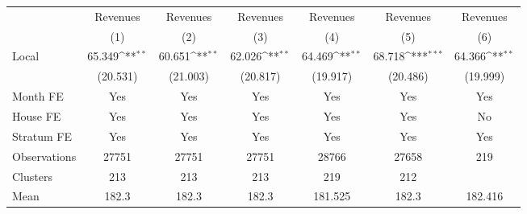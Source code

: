 {
\def\sym#1{\ifmmode^{#1}\else\(^{#1}\)\fi}
\begin{tabular}{l*{6}{c}}
\hline\hline
                &\multicolumn{1}{c}{Revenues}&\multicolumn{1}{c}{Revenues}&\multicolumn{1}{c}{Revenues}&\multicolumn{1}{c}{Revenues}&\multicolumn{1}{c}{Revenues}&\multicolumn{1}{c}{Revenues}\\
                &\multicolumn{1}{c}{(1)}         &\multicolumn{1}{c}{(2)}         &\multicolumn{1}{c}{(3)}         &\multicolumn{1}{c}{(4)}         &\multicolumn{1}{c}{(5)}         &\multicolumn{1}{c}{(6)}         \\
\hline
Local           &   65.349\sym{**} &   60.651\sym{**} &   62.026\sym{**} &   64.469\sym{**} &   68.718\sym{***}&   64.366\sym{**} \\
                & (20.531)         & (21.003)         & (20.817)         & (19.917)         & (20.486)         & (19.999)         \\
Month FE        &      Yes         &      Yes         &      Yes         &      Yes         &      Yes         &      Yes         \\
House FE        &      Yes         &      Yes         &      Yes         &      Yes         &      Yes         &       No         \\
Stratum FE      &      Yes         &      Yes         &      Yes         &      Yes         &      Yes         &      Yes         \\
\hline
Observations    &    27751         &    27751         &    27751         &    28766         &    27658         &      219         \\
Clusters        &      213         &      213         &      213         &      219         &      212         &                  \\
Mean            &    182.3         &    182.3         &    182.3         &  181.525         &    182.3         &  182.416         \\
\hline\hline
\end{tabular}
}
